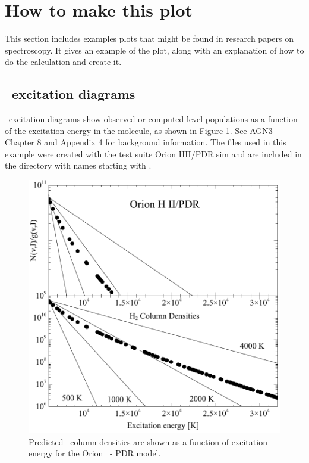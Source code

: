 \documentclass[12pt,twoside]{article}
\begin{document}
\section{How to make this plot}

This section includes examples plots that might be found in research papers on spectroscopy.
It gives an example of the plot, along with an explanation of how to do the calculation
and create it.

\subsection{\htwo\ excitation diagrams}

\htwo\ excitation diagrams show observed or computed level populations 
as a function of the excitation energy in the molecule,
as shown in Figure \ref{fig:H2BFM}.
See AGN3 Chapter 8 and Appendix 4 for background information.
The files used in this example were created with the test suite \citet{Baldwin1991} Orion HII/PDR sim and
are included in the  directory with names starting with
.

\begin{figure}
\begin{center}
\includegraphics[scale=0.5]{H2_BFM}
\end{center}
\caption{Predicted \htwo\ column densities are shown as a function of excitation energy for
the \citet{Baldwin1991} Orion  \hii\ - PDR model.}
\label{fig:H2BFM}
\end{figure}
\end{document}
